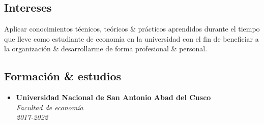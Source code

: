 \documentclass[12pt,oneside,titlepage,a4paper]{article}
\begin{document}
\begin{tcolorbox}
\begin{minipage}[t]{8cm}
\begin{tcolorbox}[grow to left by=0.6cm,colback=gray!125,colframe=white]
				\section*{\footnotesize Intereses}
				Aplicar conocimientos técnicos, teóricos \& prácticos aprendidos durante el tiempo que lleve como estudiante de economía en la universidad con el fin de beneficiar a la organización \& desarrollarme de forma profesional \& personal.
				
			\end{tcolorbox}
		\end{minipage}
		
		\hspace{0.01pt}
		
		\begin{minipage}[t]{10cm}
			\vspace*{-0.5cm}
			\begin{tcolorbox}[grow to right by=0.75cm,colframe=white,colback=white]
				\section*{Formaci\'on \& estudios} 
				\begin{itemize}
					\item {
						\textbf{Universidad Nacional de San Antonio Abad del Cusco}\\
						\emph{Facultad de econom\'ia}\\
						\emph{2017-2022}
					}
				\end{itemize}

\end{tcolorbox}
\end{minipage}
\end{tcolorbox}
\end{document}

